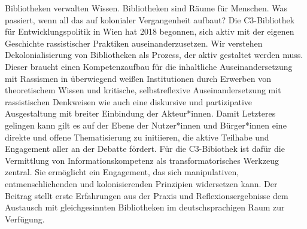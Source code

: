 Bibliotheken verwalten Wissen. Bibliotheken sind Räume für
Menschen. Was passiert, wenn all das auf kolonialer Vergangenheit
aufbaut? Die C3-Bibliothek für Entwicklungspolitik in Wien hat 2018
begonnen, sich aktiv mit der eigenen Geschichte rassistischer Praktiken
auseinanderzusetzen. Wir verstehen Dekolonialisierung von Bibliotheken
als Prozess, der aktiv gestaltet werden muss. Dieser braucht einen
Kompetenzaufbau für die inhaltliche Auseinandersetzung mit Rassismen in
überwiegend weißen Institutionen durch Erwerben von theoretischem Wissen
und kritische, selbstreflexive Auseinandersetzung mit rassistischen
Denkweisen wie auch eine diskursive und partizipative Ausgestaltung mit
breiter Einbindung der Akteur*innen. Damit Letzteres gelingen kann gilt
es auf der Ebene der Nutzer*innen und Bürger*innen eine direkte und
offene Thematisierung zu initiieren, die aktive Teilhabe und Engagement
aller an der Debatte fördert. Für die C3-Bibiothek ist dafür die
Vermittlung von Informationskompetenz als transformatorisches Werkzeug
zentral. Sie ermöglicht ein Engagement, das sich manipulativen,
entmenschlichenden und kolonisierenden Prinzipien widersetzen kann. Der
Beitrag stellt erste Erfahrungen aus der Praxis und Reflexionsergebnisse
dem Austausch mit gleichgesinnten Bibliotheken im deutschsprachigen Raum
zur Verfügung.
